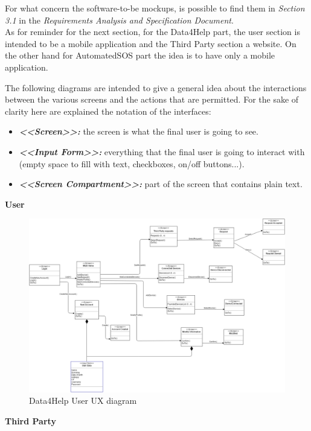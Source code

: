 \begin{flushleft}
{}

For what concern the software-to-be mockups, is possible to find them in \textit{Section 3.1} in the \textit{Requirements Analysis and Specification Document}.\\
As for reminder for the next section, for the Data4Help part, the user section is intended to be a mobile application and the Third Party section a website. On the other hand for AutomatedSOS part the idea is to have only a mobile application.
{}

The following diagrams are intended to give a general idea about the interactions between the various screens and the actions that are permitted.
For the sake of clarity here are explained the notation of the interfaces:
\begin{itemize}
\item \textbf{\textit{<<Screen>>:}} the screen is what the final user is going to see.
\item \textbf{\textit{<<Input Form>>:}} everything that the final user is going to interact with (empty space to fill with text, checkboxes, on/off buttons...).
\item \textbf{\textit{<<Screen Compartment>>:}} part of the screen that contains plain text.
\end{itemize}

{}

\textbf{User}

\begin{figure}[H]
	\centering
	\includegraphics[scale=0.3]{Images/User_interface/Trackme-Data4Helpuser}
	\caption{Data4Help User UX diagram}
\end{figure}
\newpage
\textbf{Third Party}


\end{flushleft}
